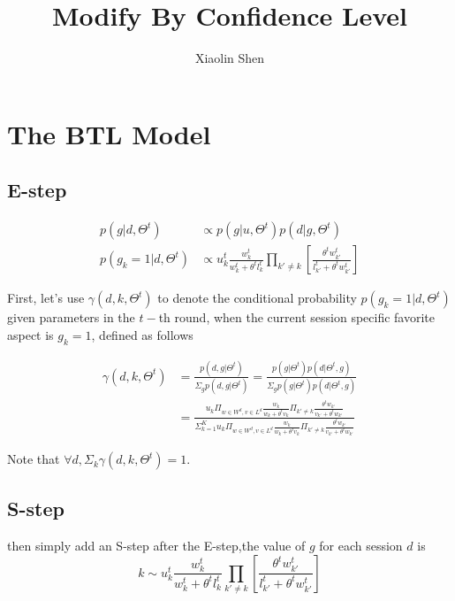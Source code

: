 \documentclass{article}
\title{Modify By Confidence Level}
\author{Xiaolin Shen}
\begin{document}
 

\maketitle


\section{The BTL Model}

\subsection{E-step}
\begin{eqnarray}
p(g|d,\Theta^{t}) & \propto   p(g|u,\Theta^{t}) p(d|g,\Theta^{t}) \\ \nonumber
 p(g_k=1|d,\Theta^{t}) & \propto  u_k^{t} \frac{w_{k}^t} {w_{k}^t+\theta^t l_{k}^t} \prod_{k'\neq k}  [\frac{\theta^t w_{k'}^t} {l_{k'}^t + \theta^t w_{k'}^t}]
\end{eqnarray}

First, let's use $\gamma(d,k,\Theta^t)$ to denote the conditional probability $p(g_k=1|d,\Theta^t)$ given parameters in the $t-$th round, when the current session specific favorite aspect is $g_k=1$, defined as follows

\begin{align}\label{equ:conditional}
\gamma(d,k,\Theta^t) &=\frac{p(d,g|\Theta^t)}{\Sigma_g p(d,g|\Theta^t)} = \frac{p(g|\Theta^t)p(d|\Theta^t,g)}{\Sigma_g p(g|\Theta^t)p(d|\Theta^t,g)}\\\nonumber
&=\frac{u_k \Pi_{w \in W^d, v\in L^d} \frac{w_k}{w_k+\theta^t v_k}\Pi_{k'\neq k}\frac{\theta^t w_{k'}}{v_{k'}+\theta^t w_{k'}}}{\Sigma_{k=1}^K u_k \Pi_{w \in W^d, v\in L^d} \frac{w_k}{w_k+\theta^t v_k}\Pi_{k'\neq k}\frac{\theta^t w_{k'}}{v_{k'}+\theta^t w_{k'}}}
\end{align}

Note that $\forall d, \Sigma_k \gamma(d,k,\Theta^t)=1$.



\subsection{S-step}
then simply add an S-step after the E-step,the value of $g$ for each session $d$ is
 \begin{equation}
 k \sim u_k^{t} \frac{w_{k}^t} {w_{k}^t+\theta^t l_{k}^t} \prod_{k'\neq k}  [\frac{\theta^t w_{k'}^t} {l_{k'}^t + \theta^t w_{k'}^t}]
 \end{equation}
\end{document}
